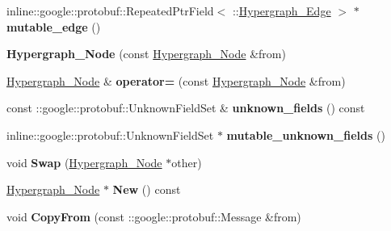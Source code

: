\begin{DoxyCompactItemize}
\item 
\hypertarget{classHypergraph__Node_abf50623da78a6e34227f129f89c1ecbf}{
inline::google::protobuf::RepeatedPtrField$<$ ::\hyperlink{classHypergraph__Edge}{Hypergraph\_\-Edge} $>$ $\ast$ {\bfseries mutable\_\-edge} ()}
\label{classHypergraph__Node_abf50623da78a6e34227f129f89c1ecbf}

\item 
\hypertarget{classHypergraph__Node_a8ff695bda4b12b720c6e45120843afa8}{
{\bfseries Hypergraph\_\-Node} (const \hyperlink{classHypergraph__Node}{Hypergraph\_\-Node} \&from)}
\label{classHypergraph__Node_a8ff695bda4b12b720c6e45120843afa8}

\item 
\hypertarget{classHypergraph__Node_a1c63124309d4c21c6f504de32472e6f4}{
\hyperlink{classHypergraph__Node}{Hypergraph\_\-Node} \& {\bfseries operator=} (const \hyperlink{classHypergraph__Node}{Hypergraph\_\-Node} \&from)}
\label{classHypergraph__Node_a1c63124309d4c21c6f504de32472e6f4}

\item 
\hypertarget{classHypergraph__Node_a5b1f1c8523851547fc23b811b9b3c983}{
const ::google::protobuf::UnknownFieldSet \& {\bfseries unknown\_\-fields} () const }
\label{classHypergraph__Node_a5b1f1c8523851547fc23b811b9b3c983}

\item 
\hypertarget{classHypergraph__Node_ad121adb128167ce797c6dd576956cdc1}{
inline::google::protobuf::UnknownFieldSet $\ast$ {\bfseries mutable\_\-unknown\_\-fields} ()}
\label{classHypergraph__Node_ad121adb128167ce797c6dd576956cdc1}

\item 
\hypertarget{classHypergraph__Node_a2436a5b49db8259590088f9a8024d77b}{
void {\bfseries Swap} (\hyperlink{classHypergraph__Node}{Hypergraph\_\-Node} $\ast$other)}
\label{classHypergraph__Node_a2436a5b49db8259590088f9a8024d77b}

\item 
\hypertarget{classHypergraph__Node_ac5023f5fe7642cd4919282002101b69e}{
\hyperlink{classHypergraph__Node}{Hypergraph\_\-Node} $\ast$ {\bfseries New} () const }
\label{classHypergraph__Node_ac5023f5fe7642cd4919282002101b69e}

\item 
\hypertarget{classHypergraph__Node_aca80a723aabad833f58bce2e69cfa1fc}{
void {\bfseries CopyFrom} (const ::google::protobuf::Message \&from)}
\label{classHypergraph__Node_aca80a723aabad833f58bce2e69cfa1fc}


\end{DoxyCompactItemize}
